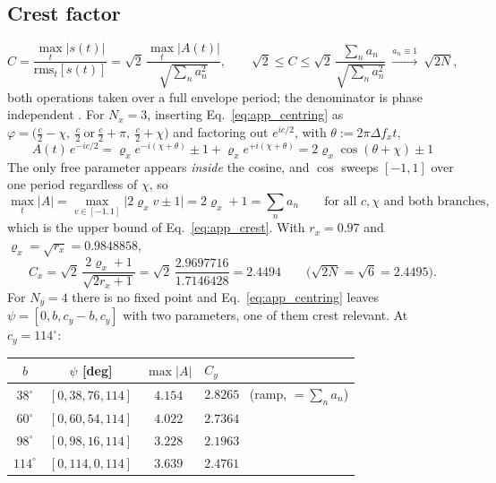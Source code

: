 \subsection{Crest factor}

\begin{equation}
C=\frac{\max_t|s(t)|}{\mathrm{rms}_t[s(t)]}
=\sqrt{2}\,\frac{\max_t|A(t)|}{\sqrt{\sum_n a_n^2}},
\qquad
\sqrt{2}\le C\le\sqrt{2}\,\frac{\sum_n a_n}{\sqrt{\sum_n a_n^2}}
\ \xrightarrow{a_n\equiv1}\ \sqrt{2N},
\label{eq:app_crest}
\end{equation}
both operations taken over a full envelope period; the denominator is
phase independent \cite{Schroeder1970,Boyd1986}. For $N_x=3$, inserting
Eq.~\eqref{eq:app_centring} as
$\varphi=\big(\tfrac{c}{2}-\chi,\ \tfrac{c}{2}\ \text{or}\ \tfrac{c}{2}+\pi,\
\tfrac{c}{2}+\chi\big)$ and factoring out $e^{ic/2}$, with
$\theta:=2\pi\Delta f_x t$,
\begin{equation}
\boxed{\;
A(t)\,e^{-ic/2}
=\varrho_x e^{-i(\chi+\theta)}\pm1+\varrho_x e^{+i(\chi+\theta)}
=2\varrho_x\cos(\theta+\chi)\pm1 \;}
\label{eq:app_n3}
\end{equation}
The only free parameter appears \emph{inside} the cosine, and $\cos$ sweeps
$[-1,1]$ over one period regardless of $\chi$, so
\begin{equation}
\max_t|A|=\max_{v\in[-1,1]}\big|2\varrho_x v\pm1\big|=2\varrho_x+1=\sum_n a_n
\qquad\text{for all }c,\chi\text{ and both branches},
\end{equation}
which is the upper bound of Eq.~\eqref{eq:app_crest}. With $r_x=0.97$ and
$\varrho_x=\sqrt{r_x}=0.9848858$,
\begin{equation}
C_x=\sqrt{2}\,\frac{2\varrho_x+1}{\sqrt{2r_x+1}}
=\sqrt{2}\,\frac{2.9697716}{1.7146428}=2.4494
\qquad\big(\sqrt{2N}=\sqrt{6}=2.4495\big).
\end{equation}
For $N_y=4$ there is no fixed point and Eq.~\eqref{eq:app_centring} leaves
$\psi=[0,b,c_y-b,c_y]$ with two parameters, one of them crest relevant. At
$c_y=114^\circ$:

\begin{center}
\begin{tabular}{cccl}
\hline
$b$ & $\psi$ [deg] & $\max|A|$ & $C_y$\\ \hline
$38^\circ$ & $[0,38,76,114]$ & $4.154$ & $2.8265$ \ (ramp, $=\sum_n a_n$)\\
$60^\circ$ & $[0,60,54,114]$ & $4.022$ & $2.7364$\\
$98^\circ$ & $[0,98,16,114]$ & $3.228$ & $2.1963$\\
$114^\circ$ & $[0,114,0,114]$ & $3.639$ & $2.4761$\\ \hline
\end{tabular}
\end{center}

